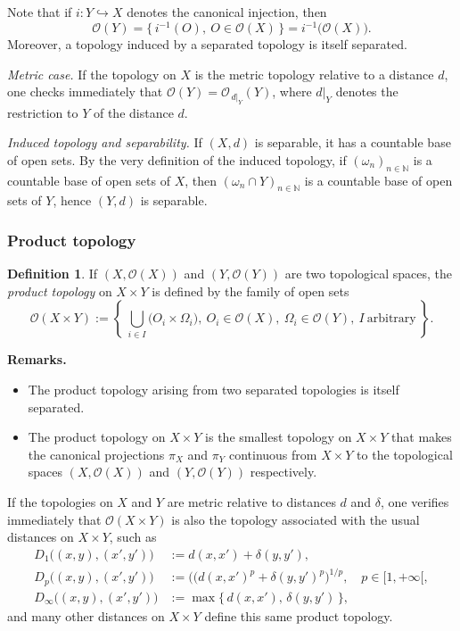 \documentclass[11pt]{article}
\theoremstyle{definition}
\newtheorem{definition}{Definition}[section]
\begin{document}
Note that if $i:Y\hookrightarrow X$ denotes the canonical injection, then
\[
\mathcal{O}(Y)=\{\,i^{-1}(O),\ O\in\mathcal{O}(X)\,\}=i^{-1}\bigl(\mathcal{O}(X)\bigr).
\]
Moreover, a topology induced by a separated topology is itself separated.

\medskip\noindent
\textit{Metric case.}
If the topology on $X$ is the metric topology relative to a distance $d$, one checks immediately that
$\mathcal{O}(Y)=\mathcal{O}_{\,d|_Y}(Y)$, where $d|_Y$ denotes the restriction to $Y$ of the distance $d$.

\medskip\noindent
\textit{Induced topology and separability.}
If $(X,d)$ is separable, it has a countable base of open sets.
By the very definition of the induced topology, if $(\omega_n)_{n\in\mathbb{N}}$ is a countable base of open sets of $X$, then $(\omega_n\cap Y)_{n\in\mathbb{N}}$ is a countable base of open sets of $Y$, hence $(Y,d)$ is separable.

\subsubsection{Product topology}

\begin{definition}
If $(X,\mathcal{O}(X))$ and $(Y,\mathcal{O}(Y))$ are two topological spaces, the \emph{product topology} on $X\times Y$ is defined by the family of open sets
\[
\mathcal{O}(X\times Y):=\left\{\ \bigcup_{i\in I}\bigl(O_i\times \Omega_i\bigr),\ O_i\in\mathcal{O}(X),\ \Omega_i\in\mathcal{O}(Y),\ I\ \text{arbitrary}\ \right\}.
\]
\end{definition}

\noindent\textbf{Remarks.}
\begin{itemize}[leftmargin=1.5em]
\item The product topology arising from two separated topologies is itself separated.
\item The product topology on $X\times Y$ is the smallest topology on $X\times Y$ that makes the canonical projections $\pi_X$ and $\pi_Y$ continuous from $X\times Y$ to the topological spaces $(X,\mathcal{O}(X))$ and $(Y,\mathcal{O}(Y))$ respectively.
\end{itemize}

If the topologies on $X$ and $Y$ are metric relative to distances $d$ and $\delta$, one verifies immediately that $\mathcal{O}(X\times Y)$ is also the topology associated with the usual distances on $X\times Y$, such as
\[
\begin{aligned}
D_1\bigl((x,y),(x',y')\bigr)&:= d(x,x')+\delta(y,y'),\\
D_p\bigl((x,y),(x',y')\bigr)&:= \bigl((d(x,x')^p+\delta(y,y')^p\bigr)^{1/p},\quad p\in[1,+\infty[,\\
D_\infty\bigl((x,y),(x',y')\bigr)&:= \max\{\,d(x,x'),\,\delta(y,y')\,\},
\end{aligned}
\]
and many other distances on $X\times Y$ define this same product topology.
\end{document}
